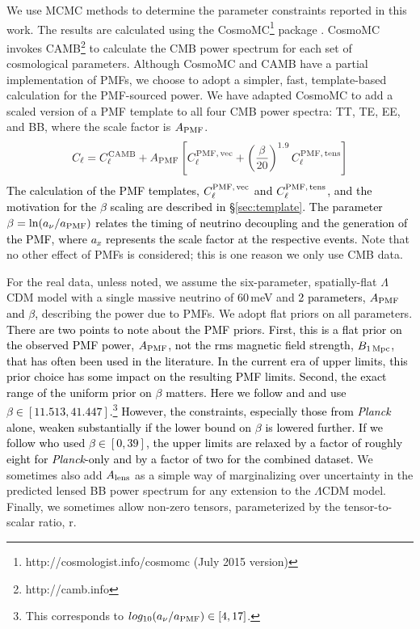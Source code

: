 \documentclass[apj]{emulateapj}
\newcommand{\cpmftens}{\ensuremath{C_{\ell}^{\rm PMF,\,tens}}}
\newcommand{\cpmfvec}{\ensuremath{C_{\ell}^{\rm PMF,\,vec}}}
\newcommand{\apmf}{\ensuremath{A_{\rm PMF}}}
\newcommand{\bpmf}{\ensuremath{B_{\rm 1\,Mpc}}}
\newcommand{\alens}{\ensuremath{A_{\rm lens}}}
\newcommand{\lcdm}{\ensuremath{\Lambda}CDM}
\newcommand{\be}{\begin{equation}}
\newcommand{\ee}{\end{equation}}
\newcommand{\planck}{{\sl Planck}}
\newcommand{\changed}[1]{\textcolor{Black}{#1}}
\begin{document}
We use MCMC methods to determine the parameter constraints reported in this work. 
The results are calculated using  the {\textsc CosmoMC}\footnote{http://cosmologist.info/cosmomc (July 2015 version)} package \citep{lewis02b}. 
CosmoMC invokes  CAMB\footnote{http://camb.info}  \citep{lewis00} to calculate the CMB power spectrum for each set of cosmological parameters. 
Although CosmoMC and CAMB have a partial implementation of PMFs, we choose to adopt a simpler, fast, template-based calculation for the PMF-sourced power. 
We have adapted CosmoMC to add a scaled version of a PMF template to all four CMB power spectra: TT, TE, EE, and BB, where the scale factor is \apmf. 
\be
\changed{C_\ell = C_\ell^{\rm{CAMB}} + \apmf \left[\cpmfvec + \left(\frac{\beta}{20}\right)^{1.9}  \cpmftens \right]}\label{clmodel}
\ee
\changed{The calculation of the PMF templates, \cpmfvec{} and \cpmftens{}, and the motivation for the $\beta$ scaling are described in \S\ref{sec:template}. 
The parameter $\beta = {\rm ln}(a_{\nu}/a_{\rm{PMF}})$ relates the timing of neutrino decoupling and the generation of the PMF, where $a_x$ represents the scale factor at the respective events. }
Note that no other effect of  PMFs is considered; this is one reason we only use CMB data.

For the real data, unless noted, we assume the six-parameter, spatially-flat \lcdm{} model with a single massive neutrino of 60\,meV and \changed{2 parameters, \apmf{} and $\beta$, }describing the power due to PMFs. 
We adopt flat priors on all parameters. 
\changed{There are two points to note about the PMF priors. 
First, this is a flat prior on the observed PMF power, $\apmf$, not the rms magnetic field strength, \bpmf, that has often been used in the literature. 
In the current era of upper limits, this prior choice has some impact on the resulting PMF limits. 
Second, the exact range of the uniform prior on $\beta$ matters. 
Here we follow \citet{planck15-19} and \citet{zucca16} and use $\beta \in [11.513, 41.447]$.\footnote{This corresponds to $log_{10} (a_{\nu}/a_{\rm{PMF}}) \in[4,17]$.}
However, the constraints, especially those from \planck{} alone, weaken substantially if the lower bound on $\beta$ is lowered further. 
If we follow \citet{polarbear15} who used $\beta \in [0,39]$, the upper limits are relaxed by a factor of roughly eight for \planck-only and by a factor of two for the combined dataset. }
We sometimes also add \alens{} as a simple way of marginalizing over uncertainty in the predicted lensed BB power spectrum for any extension to the \lcdm{} model. 
Finally, we sometimes allow non-zero tensors, parameterized by the tensor-to-scalar ratio, r. 
\end{document}
